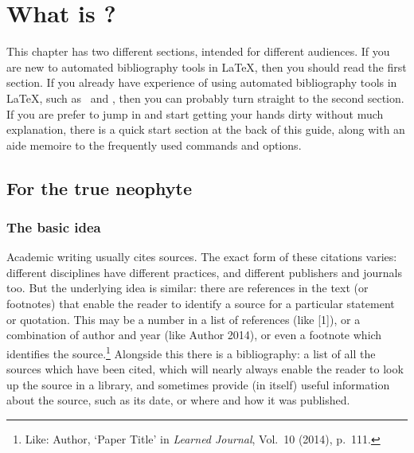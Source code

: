 
\chapter{What is ?}\label{ch:introduction}

This chapter has two different sections, intended for different
audiences. If you are new to automated bibliography tools in \LaTeX,
then you should read the first section. If
you already have experience of using automated bibliography tools in
\LaTeX, such as \bibtex\ and , then you can probably
turn straight to the second section. If you
are prefer to jump in and start getting your hands dirty without much
explanation, there is a quick start section at the back of this
guide, along with an aide memoire to
the frequently used commands and
options.

\section{For the true neophyte}

\subsection{The basic idea}
\label{newbie}

Academic writing usually cites sources. The exact form of these
citations varies: different disciplines have different practices, and
different publishers and journals too. But the underlying idea is
similar: there are references in the text (or footnotes) that enable
the reader to identify a source for a particular statement or
quotation. This may be a number in a list of references (like [1]),
or a combination of author and year (like Author 2014), or even a
footnote which identifies the source.\footnote{Like: Author, `Paper
  Title' in \emph{Learned Journal}, Vol.\ 10 (2014), p.\ 111.}
Alongside this there is a bibliography: a list of all the sources
which have been cited, which will nearly always enable the reader to
look up the source in a library, and sometimes provide (in itself)
useful information about the source, such as its date, or where
and how it was published.

